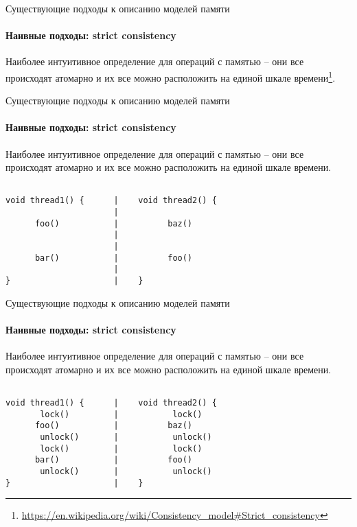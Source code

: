 \begin{frame}[fragile, t]{Существующие подходы к описанию моделей памяти}
\framesubtitle{Наивные подходы: strict consistency}

Наиболее интуитивное определение для операций с памятью -- они все происходят атомарно и их все можно расположить на единой шкале времени\footnote{\tiny\url{https://en.wikipedia.org/wiki/Consistency_model#Strict_consistency}}.

\end{frame}


\begin{frame}{Существующие подходы к описанию моделей памяти}
\framesubtitle{Наивные подходы: strict consistency}

Наиболее интуитивное определение для операций с памятью -- они все происходят атомарно и их все можно расположить на единой шкале времени.


\begin{lstlisting}

void thread1() {      |    void thread2() {                                   
                      |
      foo()           |          baz()                           
                      |
                      |
      bar()           |          foo()                           
                      |
}                     |    }                    
\end{lstlisting}
\end{frame}

\begin{frame}{Существующие подходы к описанию моделей памяти}
\framesubtitle{Наивные подходы: strict consistency}

Наиболее интуитивное определение для операций с памятью -- они все происходят атомарно и их все можно расположить на единой шкале времени.

\begin{lstlisting}

void thread1() {      |    void thread2() {                                   
       lock()         |           lock()
      foo()           |          baz()                           
       unlock()       |           unlock()
       lock()         |           lock()
      bar()           |          foo()                           
       unlock()       |           unlock()
}                     |    }                    
\end{lstlisting}	

\end{frame}


